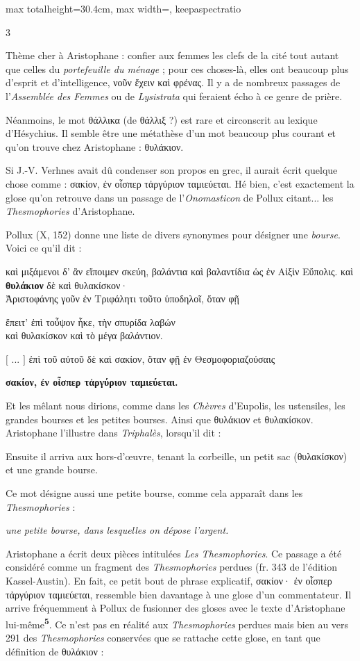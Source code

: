 \documentclass[11pt,twoside]{book}
\newcommand{\italique}[1]{\textit{#1}}
\newcommand{\citComm}[1]{\begin{quoting}[vskip=0.4pt,leftmargin=0.7em,rightmargin=0.2em]#1\end{quoting}}
\newcommand{\marqueur}[1]{\textsuperscript{\color{rubricRed}\textbf{#1}}}
\begin{document}
\begin{adjustbox}{max totalheight=30.4cm, max width=\textwidth, keepaspectratio}
\begin{minipage}{\textwidth}
{\begin{multicols}{3}
\par\vspace{1.5pt}
\noindent Thème cher à Aristophane : confier aux femmes les clefs de la cité tout autant que celles du \italique{portefeuille du ménage} ; pour ces choses-là, elles ont beaucoup plus d'esprit et d'intelligence, νοῦν ἔχειν καὶ φρένας. Il y a de nombreux passages de l'\italique{Assemblée des Femmes} ou de \italique{Lysistrata} qui feraient écho à ce genre de prière.
\par\vspace{1.5pt}
\noindent Néanmoins, le mot θάλλικα (de θάλλιξ ?) est rare et circonscrit au lexique d'Hésychius. Il semble être une métathèse d'un mot beaucoup plus courant et qu'on trouve chez Aristophane : θυλάκιον.
\par\vspace{1.5pt}
\noindent Si J.-V. Verhnes avait dû condenser son propos en grec, il aurait écrit quelque chose comme : σακίον, ἐν οἷσπερ τἀργύριον ταμιεύεται. Hé bien, c'est exactement la glose qu'on retrouve dans un passage de l'\italique{Onomasticon} de Pollux citant... les \italique{Thesmophories} d'Aristophane.
\par\vspace{1.5pt}
\noindent Pollux (X, 152) donne une liste de divers synonymes pour désigner une \italique{bourse}. Voici ce qu'il dit :
\citComm{καὶ μιξάμενοι δ’ ἂν εἴποιμεν σκεύη, βαλάντια καὶ βαλαντίδια ὡς ἐν Αἰξὶν Εὔπολις. καὶ \textbf{θυλάκιον} δὲ καὶ θυλακίσκον·\\
Ἀριστοφάνης γοῦν ἐν Τριφάλητι τοῦτο ὑποδηλοῖ, ὅταν φῇ
\citComm{ἔπειτ' ἐπὶ τοὖψον ἧκε, τὴν σπυρίδα λαβών\\
καὶ θυλακίσκον καὶ τὸ μέγα βαλάντιον. }
$[$ ... $]$
ἐπὶ τοῦ αὐτοῦ δὲ καὶ σακίον, ὅταν φῇ ἐν Θεσμοφοριαζούσαις 
\citComm{\textbf{σακίον, ἐν οἷσπερ τἀργύριον ταμιεύεται.}}
Et les mêlant nous dirions, comme dans les \italique{Chèvres} d'Eupolis, les ustensiles, les grandes bourses et les petites bourses. Ainsi que θυλάκιον et θυλακίσκον. Aristophane l'illustre dans \italique{Triphalès}, lorsqu'il dit :
\citComm{Ensuite il arriva aux hors-d'œuvre, tenant la corbeille, un petit sac (θυλακίσκον) et une grande bourse.}
Ce mot désigne aussi une petite bourse, comme cela apparaît dans les \italique{Thesmophories} :
\citComm{\italique{une petite bourse, dans lesquelles on dépose l'argent.}}}
\par\vspace{1.5pt}
\noindent Aristophane a écrit deux pièces intitulées \italique{Les Thesmophories}. Ce passage a été considéré comme un fragment des \italique{Thesmophories} perdues (fr. 343 de l'édition Kassel-Austin). En fait, ce petit bout de phrase explicatif, σακίον· ἐν οἷσπερ τἀργύριον ταμιεύεται, ressemble bien davantage à une glose d'un commentateur. Il arrive fréquemment à Pollux de fusionner des gloses avec le texte d'Aristophane lui-même\marqueur{5}. Ce n'est pas en réalité aux \italique{Thesmophories} perdues mais bien au vers 291 des \italique{Thesmophories} conservées que se rattache cette glose, en tant que définition de θυλάκιον :

\end{multicols}}
\end{minipage}
\end{adjustbox}
\end{document}

